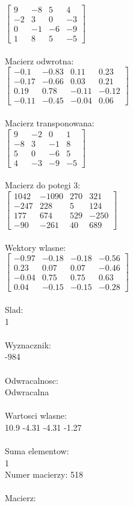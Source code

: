 \documentclass[a4paper,12pt]{article}
\begin{document}
$\begin{bmatrix} 9&-8&5&4\\-2&3&0&-3\\0&-1&-6&-9\\1&8&5&-5 \end{bmatrix}$
\\
\\
Macierz odwrotna:\\

$\begin{bmatrix} -0.1&-0.83&0.11&0.23\\-0.17&-0.66&0.03&0.21\\0.19&0.78&-0.11&-0.12\\-0.11&-0.45&-0.04&0.06 \end{bmatrix}$
\\
\\
Macierz transponowana:\\

$\begin{bmatrix} 9&-2&0&1\\-8&3&-1&8\\5&0&-6&5\\4&-3&-9&-5 \end{bmatrix}$
\\
\\
Macierz do potegi 3:\\

$\begin{bmatrix} 1042&-1090&270&321\\-247&228&5&124\\177&674&529&-250\\-90&-261&40&689 \end{bmatrix}$
\\
\\
Wektory wlasne:\\

$\begin{bmatrix} -0.97&-0.18&-0.18&-0.56\\0.23&0.07&0.07&-0.46\\-0.04&0.75&0.75&0.63\\0.04&-0.15&-0.15&-0.28 \end{bmatrix}$
\\
\\
Slad:\\
1
\\
\\
Wyznacznik:\\
-984
\\
\\
Odwracalnosc:\\
Odwracalna
\\
\\
Wartosci wlasne:\\
10.9 -4.31 -4.31 -1.27
\\
\\
Suma elementow:\\
1
\\
\newpage
Numer macierzy:
518
\\
\\
Macierz:\\
\end{document}
